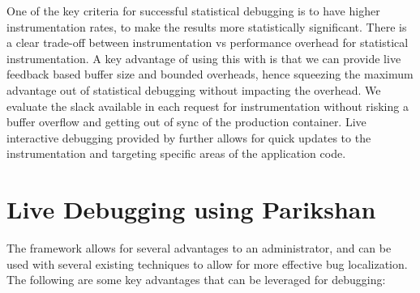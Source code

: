 One of the key criteria for successful statistical debugging is to have higher instrumentation rates, to make the results more statistically significant. 
There is a clear trade-off between instrumentation vs performance overhead for statistical instrumentation. 
A key advantage of using this with \parikshan is that we can provide live feedback based buffer size and bounded overheads, hence squeezing the maximum advantage out of statistical debugging without impacting the overhead. 
We evaluate the slack available in each request for instrumentation without risking a buffer overflow and getting out of sync of the production container.
Live interactive debugging provided by \parikshan further allows for quick updates to the instrumentation and targeting specific areas of the application code.
\fi

\section{Live Debugging using Parikshan}
\label{sec:existing techniques}

The \parikshan framework allows for several advantages to an administrator, and can be used with several existing techniques to allow for more effective bug localization. 
The following are some key advantages that can be leveraged for debugging:

